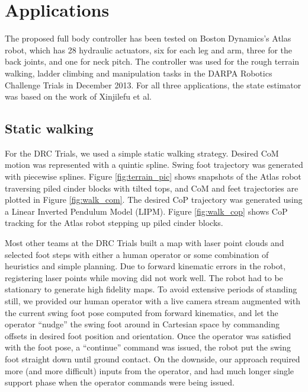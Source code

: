 \documentclass{ws-ijhr}
\newcommand{\fref}[1] {Figure \ref{#1}}
\begin{document}
\section{Applications}
\label{sec:trials_tasks}
The proposed full body controller has been tested on Boston Dynamics's Atlas robot,
which has 28 hydraulic actuators, six for each leg and arm, three for the back 
joints, and one for neck pitch. 
The controller was used for the rough terrain walking, ladder climbing
and manipulation tasks in the DARPA Robotics Challenge Trials in December 2013. 
For all three applications, the state estimator was based on the work of 
Xinjilefu et al. \cite{xinji}

\subsection{Static walking}
\label{sec:static_walking}
For the DRC Trials, we used a simple static walking strategy. 
Desired CoM motion was represented with a quintic spline. 
Swing foot trajectory was generated with piecewise splines. 
\fref{fig:terrain_pic} shows snapshots of the Atlas robot traversing piled cinder
blocks with tilted tops, and CoM and feet trajectories are plotted in 
\fref{fig:walk_com}. 
The desired CoP trajectory was generated using a Linear Inverted Pendulum 
Model (LIPM). 
\fref{fig:walk_cop} shows CoP tracking for the Atlas robot stepping up piled cinder blocks. 

Most other teams at the DRC Trials built a map with laser point clouds and 
selected foot steps with either a human operator or some combination of 
heuristics and simple planning. 
Due to forward kinematic errors in the robot, registering laser points while
moving did not work well. 
The robot had to be stationary to generate high fidelity maps. 
To avoid extensive periods of standing still, we provided our human operator 
with a live camera stream augmented with the current swing foot pose computed
from forward kinematics, and let the operator ``nudge'' the swing foot around
in Cartesian space by commanding offsets in desired foot position and orientation. 
Once the operator was satisfied with the foot pose, a ``continue'' command was 
issued, the robot put the swing foot straight down until ground contact. 
On the downside, our approach required more (and more difficult) inputs from 
the operator, and had much longer single support phase when the operator 
commands were being issued.
\end{document}
